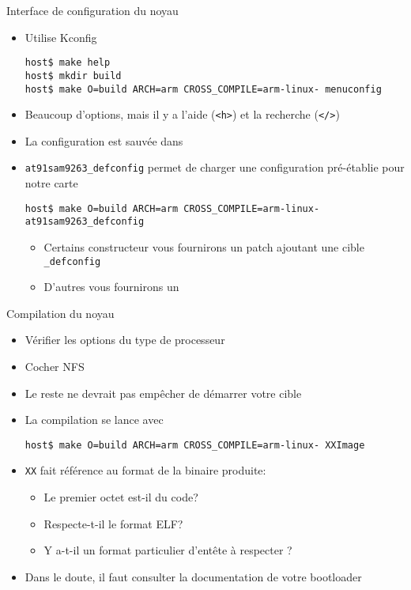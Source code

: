 \begin{frame}[fragile=singleslide]{Interface de configuration du noyau}
  \begin{itemize}
    \item Utilise Kconfig
      \begin{lstlisting}
host$ make help
host$ mkdir build
host$ make O=build ARCH=arm CROSS_COMPILE=arm-linux- menuconfig
       \end{lstlisting}
     \item  Beaucoup d'options,  mais il  y a  l'aide (\verb+<h>+)  et la
       recherche (\verb+</>+)
    \item La configuration est sauvée dans 
    \item    \verb+at91sam9263_defconfig+   permet   de    charger   une
      configuration pré-établie pour notre carte
      \begin{lstlisting}
host$ make O=build ARCH=arm CROSS_COMPILE=arm-linux- at91sam9263_defconfig
      \end{lstlisting}
    \begin{itemize}
    \item Certains constructeur vous  fournirons un patch ajoutant une
      cible \verb+_defconfig+
    \item D'autres vous fournirons un 
    \end{itemize}
  \end{itemize}
\end{frame}

\begin{frame}[fragile=singleslide]{Compilation du noyau}
  \begin{itemize}
  \item Vérifier les options du type de processeur
  \item Cocher NFS
  \item Le reste ne devrait pas empêcher de démarrer votre cible
  \item La compilation se lance avec
    \begin{lstlisting}
host$ make O=build ARCH=arm CROSS_COMPILE=arm-linux- XXImage
    \end{lstlisting}
  \item \verb+XX+ fait référence au format de la binaire produite:
    \begin{itemize}
    \item Le premier octet est-il du code?
    \item Respecte-t-il le format ELF?
    \item Y a-t-il un format particulier d'entête à respecter ?
    \end{itemize}
  \item Dans  le doute,  il faut consulter  la documentation  de votre
    bootloader
  \end{itemize}
\end{frame}

